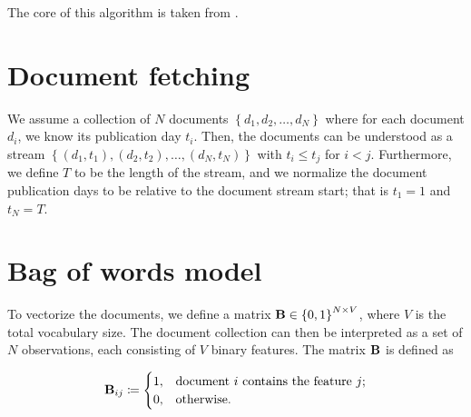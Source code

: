 

\newcommand{\doccount}{N}
\newcommand{\featcount}{V}
\newcommand{\streamlen}{T}
\newcommand{\traj}{y}
\newcommand{\df}{DF}
\newcommand{\featset}{\text{M}}
\newcommand{\cost}{\text{C}}

\newcommand{\docoverlap}{\text{d}}
\newcommand{\featsim}{\text{JSD}}

\newcommand{\bowmat}{\mat{B}}
\newcommand{\dtdmat}{\mat{D}}
\newcommand{\trajmat}{\mat{T}}


The core of this algorithm is taken from \cite{event-detection}.

\section{Document fetching}
We assume a collection of $N$ documents $\left\{ d_{1}, d_{2}, \dots, d_{\doccount} \right\}$ where for each document $d_{i}$, we know its publication day $t_{i}$. Then, the documents can be understood as a stream $\left\{ (d_{1}, t_{1}), (d_{2}, t_{2}), \dots, (d_{\doccount}, t_{\doccount}) \right\}$ with $t_{i} \leq t_{j}$ for $i < j$. Furthermore, we define $\streamlen$ to be the length of the stream, and we normalize the document publication days to be relative to the document stream start; that is $t_{1} = 1$ and $t_{\doccount} = \streamlen$.


\section{Bag of words model}
To vectorize the documents, we define a matrix $\bowmat \in \left\{ 0, 1 \right\}^{\doccount \times \featcount}$, where $\featcount$ is the total vocabulary size. The document collection can then be interpreted as a set of $\doccount$ observations, each consisting of $\featcount$ binary features. The matrix $\bowmat$ is defined as

\begin{equation} \label{eq:bow-matrix}
	\bowmat_{ij} \coloneqq
	\begin{cases}
		1, & \text{document}~i~\text{contains the feature}~j \text{;} \\
		0, & \text{otherwise.}
	\end{cases}
\end{equation}

